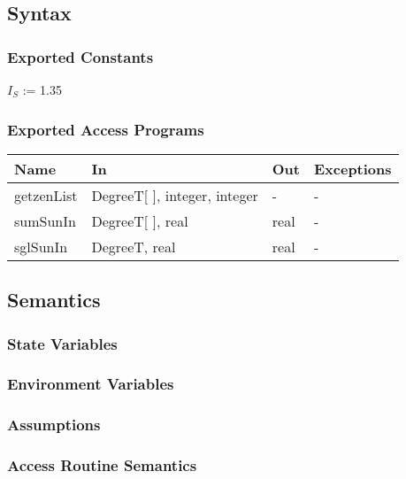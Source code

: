 \documentclass[12pt, titlepage]{article}
\begin{document}
\subsection{Syntax}

\subsubsection{Exported Constants}
$I_{S}$ := 1.35\\

\subsubsection{Exported Access Programs}

\begin{center}
\begin{tabular}{p{2cm} p{4cm} p{4cm} p{2cm}}
\hline
\textbf{Name} & \textbf{In} & \textbf{Out} & \textbf{Exceptions} \\
\hline
getzenList & DegreeT[ ], integer, integer & - & - \\
sumSunIn & DegreeT[ ], real & real & - \\
sglSunIn & DegreeT, real & real & - \\

\hline
\end{tabular}
\end{center}

\subsection{Semantics}

\subsubsection{State Variables}


\subsubsection{Environment Variables}


\subsubsection{Assumptions}


\subsubsection{Access Routine Semantics}
\end{document}
